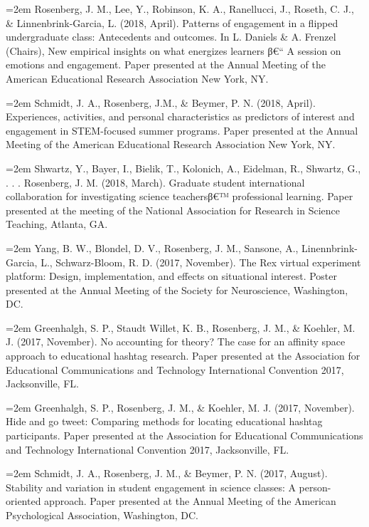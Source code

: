 \documentclass[]{article}
\newcommand{\euro}{€}
\begin{document}
\hangindent=2em Rosenberg, J. M., Lee, Y., Robinson, K. A., Ranellucci,
J., Roseth, C. J., \& Linnenbrink-Garcia, L. (2018, April). Patterns of
engagement in a flipped undergraduate class: Antecedents and outcomes.
In L. Daniels \& A. Frenzel (Chairs), New empirical insights on what
energizes learners β\euro{}`` A session on emotions and engagement.
Paper presented at the Annual Meeting of the American Educational
Research Association New York, NY.

\hangindent=2em Schmidt, J. A., Rosenberg, J.M., \& Beymer, P. N. (2018,
April). Experiences, activities, and personal characteristics as
predictors of interest and engagement in STEM-focused summer programs.
Paper presented at the Annual Meeting of the American Educational
Research Association New York, NY.

\hangindent=2em Shwartz, Y., Bayer, I., Bielik, T., Kolonich, A.,
Eidelman, R., Shwartz, G., . . . Rosenberg, J. M. (2018, March).
Graduate student international collaboration for investigating science
teachersβ\euro{}™ professional learning. Paper presented at the meeting
of the National Association for Research in Science Teaching, Atlanta,
GA.

\hangindent=2em Yang, B. W., Blondel, D. V., Rosenberg, J. M., Sansone,
A., Linennbrink-Garcia, L., Schwarz-Bloom, R. D. (2017, November). The
Rex virtual experiment platform: Design, implementation, and effects on
situational interest. Poster presented at the Annual Meeting of the
Society for Neuroscience, Washington, DC.

\hangindent=2em Greenhalgh, S. P., Staudt Willet, K. B., Rosenberg, J.
M., \& Koehler, M. J. (2017, November). No accounting for theory? The
case for an affinity space approach to educational hashtag research.
Paper presented at the Association for Educational Communications and
Technology International Convention 2017, Jacksonville, FL.

\hangindent=2em Greenhalgh, S. P., Rosenberg, J. M., \& Koehler, M. J.
(2017, November). Hide and go tweet: Comparing methods for locating
educational hashtag participants. Paper presented at the Association for
Educational Communications and Technology International Convention 2017,
Jacksonville, FL.

\hangindent=2em Schmidt, J. A., Rosenberg, J. M., \& Beymer, P. N.
(2017, August). Stability and variation in student engagement in science
classes: A person-oriented approach. Paper presented at the Annual
Meeting of the American Psychological Association, Washington, DC.
\end{document}
